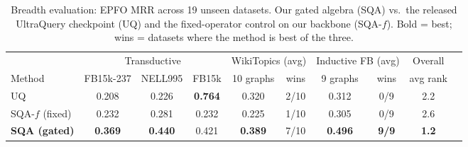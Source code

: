 \documentclass[journal]{IEEEtran}
\begin{document}
\begin{table}[t]
\centering
\caption{Breadth evaluation: EPFO MRR across 19 unseen datasets. Our gated
algebra (SQA) vs.\ the released UltraQuery checkpoint (UQ) and the
fixed-operator control on our backbone (SQA-$f$). Bold = best; wins =
datasets where the method is best of the three.}
\label{tab:breadth}
\small
\begin{tabular}{lcccc|cc|cc|r}
\toprule
& \multicolumn{3}{c|}{Transductive} & \multicolumn{2}{c|}{WikiTopics (avg)} & \multicolumn{2}{c|}{Inductive FB (avg)} & Overall \\
Method & FB15k-237 & NELL995 & FB15k & 10 graphs & wins & 9 graphs & wins & avg rank \\
\midrule
UQ & 0.208 & 0.226 & \textbf{0.764} & 0.320 & 2/10 & 0.312 & 0/9 & 2.2 \\
SQA-$f$ (fixed) & 0.232 & 0.281 & 0.232 & 0.225 & 1/10 & 0.305 & 0/9 & 2.6 \\
\textbf{SQA (gated)} & \textbf{0.369} & \textbf{0.440} & 0.421 & \textbf{0.389} & 7/10 & \textbf{0.496} & \textbf{9/9} & \textbf{1.2} \\
\bottomrule
\end{tabular}
\end{table}
\end{document}
